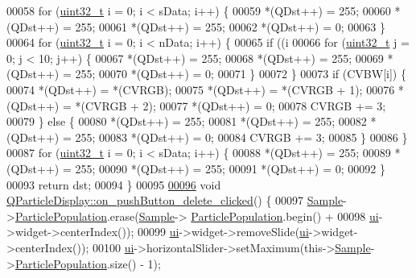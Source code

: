 \begin{DoxyCode}
00058   \textcolor{keywordflow}{for} (\hyperlink{_soil_math_types_8h_a435d1572bf3f880d55459d9805097f62}{uint32\_t} i = 0; i < sData; i++) \{
00059     *(QDst++) = 255;
00060     *(QDst++) = 255;
00061     *(QDst++) = 255;
00062     *(QDst++) = 0;
00063   \}
00064   \textcolor{keywordflow}{for} (\hyperlink{_soil_math_types_8h_a435d1572bf3f880d55459d9805097f62}{uint32\_t} i = 0; i < nData; i++) \{
00065     \textcolor{keywordflow}{if} ((i %
00066       \textcolor{keywordflow}{for} (\hyperlink{_soil_math_types_8h_a435d1572bf3f880d55459d9805097f62}{uint32\_t} j = 0; j < 10; j++) \{
00067         *(QDst++) = 255;
00068         *(QDst++) = 255;
00069         *(QDst++) = 255;
00070         *(QDst++) = 0;
00071       \}
00072     \}
00073     \textcolor{keywordflow}{if} (CVBW[i]) \{
00074       *(QDst++) = *(CVRGB);
00075       *(QDst++) = *(CVRGB + 1);
00076       *(QDst++) = *(CVRGB + 2);
00077       *(QDst++) = 0;
00078       CVRGB += 3;
00079     \} \textcolor{keywordflow}{else} \{
00080       *(QDst++) = 255;
00081       *(QDst++) = 255;
00082       *(QDst++) = 255;
00083       *(QDst++) = 0;
00084       CVRGB += 3;
00085     \}
00086   \}
00087   \textcolor{keywordflow}{for} (\hyperlink{_soil_math_types_8h_a435d1572bf3f880d55459d9805097f62}{uint32\_t} i = 0; i < sData; i++) \{
00088     *(QDst++) = 255;
00089     *(QDst++) = 255;
00090     *(QDst++) = 255;
00091     *(QDst++) = 0;
00092   \}
00093   \textcolor{keywordflow}{return} dst;
00094 \}
00095 
\hypertarget{qparticledisplay_8cpp_source_l00096}{}\hyperlink{class_q_particle_display_a234e7c98453cad1e0d63c12b7495003a}{00096} \textcolor{keywordtype}{void} \hyperlink{class_q_particle_display_a234e7c98453cad1e0d63c12b7495003a}{QParticleDisplay::on\_pushButton\_delete\_clicked}() \{
00097   \hyperlink{class_q_particle_display_a24a25733ffa557a66bf7d776b7af8536}{Sample}->\hyperlink{class_soil_analyzer_1_1_sample_a877bf12069fe09d2c8f9636f19ed5335}{ParticlePopulation}.erase(\hyperlink{class_q_particle_display_a24a25733ffa557a66bf7d776b7af8536}{Sample}->
      \hyperlink{class_soil_analyzer_1_1_sample_a877bf12069fe09d2c8f9636f19ed5335}{ParticlePopulation}.begin() +
00098                                    \hyperlink{class_q_particle_display_ae4e6c27c6c2059b4e08358938044a18c}{ui}->widget->centerIndex());
00099   \hyperlink{class_q_particle_display_ae4e6c27c6c2059b4e08358938044a18c}{ui}->widget->removeSlide(\hyperlink{class_q_particle_display_ae4e6c27c6c2059b4e08358938044a18c}{ui}->widget->centerIndex());
00100   \hyperlink{class_q_particle_display_ae4e6c27c6c2059b4e08358938044a18c}{ui}->horizontalSlider->setMaximum(this->\hyperlink{class_q_particle_display_a24a25733ffa557a66bf7d776b7af8536}{Sample}->\hyperlink{class_soil_analyzer_1_1_sample_a877bf12069fe09d2c8f9636f19ed5335}{ParticlePopulation}.size() - 1);

\end{DoxyCode}
